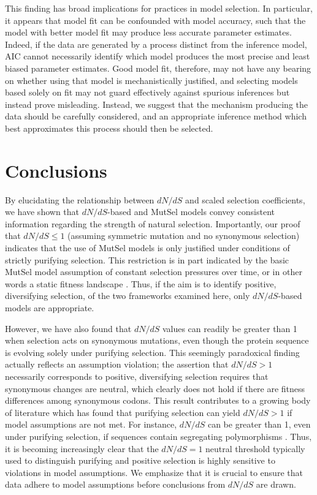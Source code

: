 \documentclass[11pt]{article}
\begin{document}
This finding has broad implications for practices in model selection. In particular, it appears that model fit can be confounded with model accuracy, such that the model with better model fit may produce less accurate parameter estimates. Indeed, if the data are generated by a process distinct from the inference model, AIC cannot necessarily identify which model produces the most precise and least biased parameter estimates. Good model fit, therefore, may not have any bearing on whether using that model is mechanistically justified, and selecting models based solely on fit may not guard effectively against spurious inferences but instead prove misleading. Instead, we suggest that the mechanism producing the data should be carefully considered, and an appropriate inference method which best approximates this process should then be selected. 

\section*{Conclusions}
By elucidating the relationship between $dN/dS$ and scaled selection coefficients, we have shown that $dN/dS$-based and MutSel models convey consistent information regarding the strength of natural selection. Importantly, our proof that $dN/dS \leq 1$ (assuming symmetric mutation and no synonymous selection) indicates that the use of MutSel models is only justified under conditions of strictly purifying selection. This restriction is in part indicated by the basic MutSel model assumption of constant selection pressures over time, or in other words a static fitness landscape \citep{HalpernBruno1998,Thorneetal2007,Rodrigueetal2010,Thorne2012}. Thus, if the aim is to identify positive, diversifying selection, of the two frameworks examined here, only $dN/dS$-based models are appropriate. 

However, we have also found that $dN/dS$ values can readily be greater than 1 when selection acts on synonymous mutations, even though the protein sequence is evolving solely under purifying selection. This seemingly paradoxical finding actually reflects an assumption violation; the assertion that $dN/dS > 1$ necessarily corresponds to positive, diversifying selection requires that synonymous changes are neutral, which clearly does not hold if there are fitness differences among synonymous codons. This result contributes to a growing body of literature which has found that purifying selection can yield $dN/dS > 1$ if model assumptions are not met. For instance, $dN/dS$ can be greater than 1, even under purifying selection, if sequences contain segregating polymorphisms \citep{Rochaetal2006,KryazhimskiyPlotkin2008,Mugaletal2014}. Thus, it is becoming increasingly clear that the $dN/dS = 1$ neutral threshold typically used to distinguish purifying and positive selection is highly sensitive to violations in model assumptions. We emphasize that it is crucial to ensure that data adhere to model assumptions before conclusions from $dN/dS$ are drawn.
\end{document}
